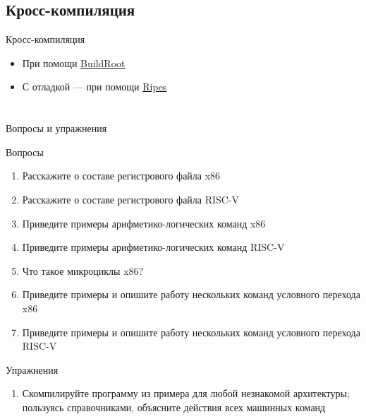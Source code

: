 \documentclass[xetex,aspectratio=43]{beamer}
\begin{document}
\subsection{Кросс-компиляция}

\begin{frame}{Кросс-компиляция}
    \begin{itemize}
        \item При помощи \href{https://buildroot.org/}{BuildRoot}
        \item С отладкой — при помощи \href{http://ripes.me/Ripes/}{Ripes} %
    \end{itemize}
\end{frame}


\section*{}

\begin{frame}{Вопросы и упражнения}
    \begin{block}{Вопросы}
        \begin{enumerate}
            \tightlist
            \item
            Расскажите о составе регистрового файла x86
            \item
            Расскажите о составе регистрового файла RISC-V
            \item
            Приведите примеры арифметико-логических команд x86
            \item
            Приведите примеры арифметико-логических команд RISC-V
            \item
            Что такое микроциклы x86?
            \item
            Приведите примеры и опишите работу нескольких команд условного
            перехода x86
            \item
            Приведите примеры и опишите работу нескольких команд условного
            перехода RISC-V
        \end{enumerate}
    \end{block}

    \begin{block}{Упражнения}
        \begin{enumerate}
            \tightlist
            \item
            Скомпилируйте программу из примера для любой незнакомой архитектуры;
            пользуясь справочниками, объясните действия всех машинных команд
        \end{enumerate}
    \end{block}
\end{frame}

\postamble
\end{document}
